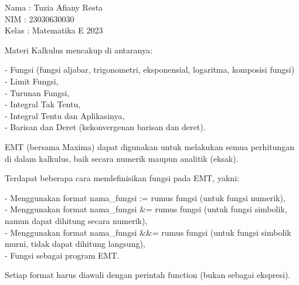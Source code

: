 \documentclass[a4paper,10pt]{article}
\begin{document}
\begin{eulernotebook}
\begin{eulercomment}
Nama  : Tuzia Afiany Resta\\
NIM   : 23030630030\\
Kelas : Matematika E 2023\\
\end{eulercomment}
\eulersubheading{}
\begin{eulercomment}
Materi Kalkulus mencakup di antaranya:

- Fungsi (fungsi aljabar, trigonometri, eksponensial, logaritma,
komposisi fungsi)\\
- Limit Fungsi,\\
- Turunan Fungsi,\\
- Integral Tak Tentu,\\
- Integral Tentu dan Aplikasinya,\\
- Barisan dan Deret (kekonvergenan barisan dan deret).

EMT (bersama Maxima) dapat digunakan untuk melakukan semua perhitungan
di dalam kalkulus, baik secara numerik maupun analitik (eksak).

\end{eulercomment}
\begin{eulercomment}
Terdapat beberapa cara mendefinisikan fungsi pada EMT, yakni:

- Menggunakan format nama\_fungsi := rumus fungsi (untuk fungsi
numerik),\\
- Menggunakan format nama\_fungsi \&= rumus fungsi (untuk fungsi
simbolik, namun dapat dihitung secara numerik),\\
- Menggunakan format nama\_fungsi \&\&= rumus fungsi (untuk fungsi
simbolik murni, tidak dapat dihitung langsung),\\
- Fungsi sebagai program EMT.

Setiap format harus diawali dengan perintah function (bukan sebagai
ekspresi).


\end{eulercomment}
\end{eulernotebook}
\end{document}
